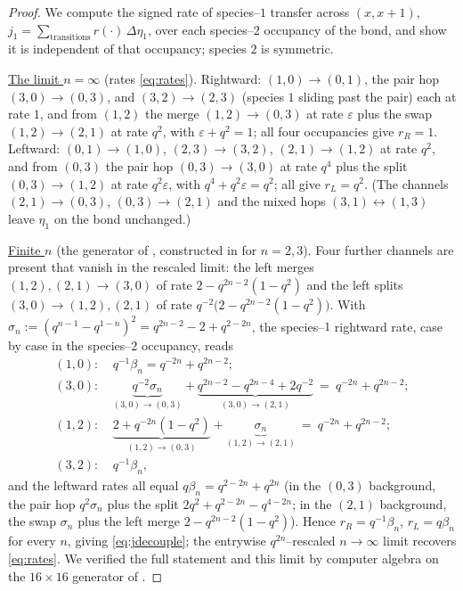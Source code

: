 \documentclass[11pt]{article}
\theoremstyle{plain}
\theoremstyle{definition}
\theoremstyle{remark}
\newcommand{\eps}{\varepsilon}\newcommand{\Exp}{\mathrm{Exp}}
\begin{document}
\begin{proof}
We compute the signed rate of species--$1$ transfer across $(x,x{+}1)$,
$j_1=\sum_{\text{transitions}}r(\cdot)\,\Delta\eta_1$, over each species--$2$ occupancy
of the bond, and show it is independent of that occupancy; species $2$ is symmetric.

\underline{The limit $n=\infty$} \textup{(}rates \eqref{eq:rates}\textup{)}. Rightward:
$(1,0)\!\to\!(0,1)$, the pair hop $(3,0)\!\to\!(0,3)$, and $(3,2)\!\to\!(2,3)$ (species
$1$ sliding past the pair) each at rate $1$, and from $(1,2)$ the merge
$(1,2)\!\to\!(0,3)$ at rate $\eps$ plus the swap $(1,2)\!\to\!(2,1)$ at rate $q^2$, with
$\eps+q^2=1$; all four occupancies give $r_R=1$. Leftward: $(0,1)\!\to\!(1,0)$,
$(2,3)\!\to\!(3,2)$, $(2,1)\!\to\!(1,2)$ at rate $q^2$, and from $(0,3)$ the pair hop
$(0,3)\!\to\!(3,0)$ at rate $q^4$ plus the split $(0,3)\!\to\!(1,2)$ at rate $q^2\eps$,
with $q^4+q^2\eps=q^2$; all give $r_L=q^2$. (The channels $(2,1)\!\to\!(0,3)$,
$(0,3)\!\to\!(2,1)$ and the mixed hops $(3,1)\!\leftrightarrow\!(1,3)$ leave $\eta_1$ on
the bond unchanged.)

\underline{Finite $n$} \textup{(}the generator of \cite[\S2.1]{REU}, constructed in
\cite{KLLPZ} for $n=2,3$\textup{)}. Four further channels are present that vanish in the
rescaled limit: the left merges $(1,2),(2,1)\to(3,0)$ of rate $2-q^{2n-2}(1-q^2)$ and
the left splits $(3,0)\to(1,2),(2,1)$ of rate $q^{-2}\big(2-q^{2n-2}(1-q^2)\big)$. With
$\sigma_n:=(q^{n-1}-q^{1-n})^2=q^{2n-2}-2+q^{2-2n}$, the species--$1$ rightward rate,
case by case in the species--$2$ occupancy, reads
\begin{align*}
  (1,0)\colon&\ q^{-1}\beta_n=q^{-2n}+q^{2n-2};\\
  (3,0)\colon&\ \underbrace{q^{-2}\sigma_n}_{(3,0)\to(0,3)}
    +\underbrace{q^{2n-2}-q^{2n-4}+2q^{-2}}_{(3,0)\to(2,1)}\ =\ q^{-2n}+q^{2n-2};\\
  (1,2)\colon&\ \underbrace{2+q^{-2n}(1-q^2)}_{(1,2)\to(0,3)}
    +\underbrace{\sigma_n}_{(1,2)\to(2,1)}\ =\ q^{-2n}+q^{2n-2};\\
  (3,2)\colon&\ q^{-1}\beta_n,
\end{align*}
and the leftward rates all equal $q\beta_n=q^{2-2n}+q^{2n}$ (in the $(0,3)$ background,
the pair hop $q^2\sigma_n$ plus the split $2q^2+q^{2-2n}-q^{4-2n}$; in the $(2,1)$
background, the swap $\sigma_n$ plus the left merge $2-q^{2n-2}(1-q^2)$). Hence
$r_R=q^{-1}\beta_n$, $r_L=q\beta_n$ for every $n$, giving \eqref{eq:jdecouple}; the
entrywise $q^{2n}$--rescaled $n\to\infty$ limit recovers \eqref{eq:rates}. We verified
the full statement and this limit by computer algebra on the $16\times16$ generator of
\cite[\S2.1]{REU}.


\end{proof}
\end{document}
